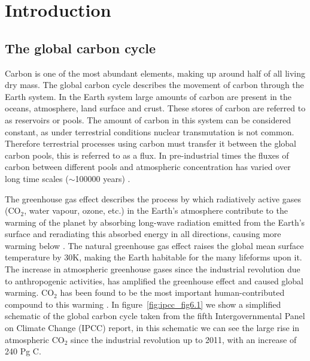 

\section{Introduction}

\subsection{The global carbon cycle} \label{sec:global_c_cycle}

Carbon is one of the most abundant elements, making up around half of all living dry mass. The global carbon cycle describes the movement of carbon through the Earth system. In the Earth system large amounts of carbon are present in the oceans, atmosphere, land surface and crust. These stores of carbon are referred to as reservoirs or pools. The amount of carbon in this system can be considered constant, as under terrestrial conditions nuclear transmutation is not common. Therefore terrestrial processes using carbon must transfer it between the global carbon pools, this is referred to as a flux. In pre-industrial times the fluxes of carbon between different pools and atmospheric concentration has varied over long time scales (\(\sim\)100000 years) \citep{luthi2008high}.

The greenhouse gas effect describes the process by which radiatively active gases (CO\(_{2}\), water vapour, ozone, etc.) in the Earth's atmosphere contribute to the warming of the planet by absorbing long-wave radiation emitted from the Earth's surface and reradiating this absorbed energy in all directions, causing more warming below \citep{mitchell1989greenhouse}. The natural greenhouse gas effect raises the global mean surface temperature by 30K, making the Earth habitable for the many lifeforms upon it. The increase in atmospheric greenhouse gases since the industrial revolution due to anthropogenic activities, has amplified the greenhouse effect and caused global warming. CO\(_{2}\) has been found to be the most important human-contributed compound to this warming \citep{Falkowski291}. In figure~\ref{fig:ipcc_fig6.1} we show a simplified schematic of the global carbon cycle taken from the fifth Intergovernmental Panel on Climate Change (IPCC) report, in this schematic we can see the large rise in atmospheric CO\(_{2}\) since the industrial revolution up to 2011, with an increase of 240 Pg C.

